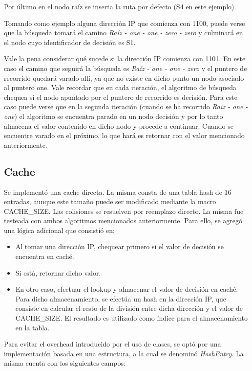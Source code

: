 Por último en el nodo raíz se inserta la ruta por defecto (S4 en este ejemplo).

Tomando como ejemplo alguna dirección IP que comienza con 1100, puede verse que la búsqueda tomará el camino \textit{Raíz - one - one - zero - zero} y culminará en el nodo cuyo identificador de decisión es S1. 

Vale la pena considerar qué sucede si la dirección IP comienza con 1101. En este caso el camino que seguirá la búsqueda es \textit{Raíz - one - one - zero} y el puntero de recorrido quedará varado allí, ya que no existe en dicho punto un nodo asociado al puntero one. Vale recordar que en cada iteración, el algoritmo de búsqueda chequea si el nodo apuntado por el puntero de recorrido es decisión. Para este caso puede verse que en la segunda iteración (cuando se ha recorrido \textit{Raíz - one - one}) el algoritmo se encuentra parado en un nodo decisión y por lo tanto almacena el valor contenido en dicho nodo y procede a continuar. Cuando se encuentre varado en el próximo, lo que hará es retornar con el valor mencionado anteriormente. 

\subsection {Cache}

Se implementó una cache directa. La misma consta de una tabla hash de 16 entradas, aunque este tamaño puede ser modificado mediante la macro CACHE\_SIZE. Las colisiones se resuelven por reemplazo directo. La misma fue testeada con ambos algoritmos mencionados anteriormente. Para ello, se agregó una lógica adicional que consistió en:

\begin{itemize}
	\item Al tomar una dirección IP, chequear primero si el valor de decisión se encuentra en caché.
	\item Si está, retornar dicho valor.
	\item En otro caso, efectuar el lookup y almacenar el valor de decisión en caché. Para dicho almacenamiento, se efectúa un hash en la dirección IP, que consiste en calcular el resto de la división entre dicha dirección y el valor de CACHE\_SIZE. El resultado es utilizado como índice para el almacenamiento en la tabla.
\end{itemize}

Para evitar el overhead introducido por el uso de clases, se optó por una implementación basada en una estructura, a la cual se denominó \textit{HashEntry}. La misma cuenta con los siguientes campos:

